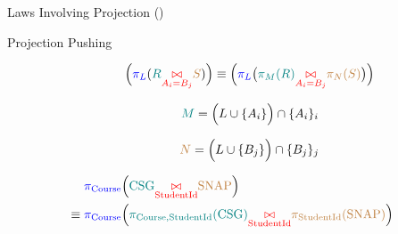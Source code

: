 
\begin{frame}{}
\end{frame}

\begin{frame}{}
\end{frame}


\begin{frame}
  \centerline{\Large Laws Involving Projection ()}

  \vspace{0.40cm}
  \begin{description}
    \item[Projection Pushing]
    \[
      \Big(\textcolor{blue}{\pi_{L}}(\textcolor{teal}{R} \textcolor{red}{\underset{A_i = B_j} \bowtie} \textcolor{brown}{S})\Big) \equiv 
	\Big(\textcolor{blue}{\pi_{L}}\big(\textcolor{teal}{\pi_{M}(R)} \textcolor{red}{\underset{A_i = B_j} \bowtie} \textcolor{brown}{\pi_{N}(S)}\big)\Big)
    \]

    \[
      \textcolor{teal}{M} = \Big(L \cup \{A_i\}\Big) \cap \{A_i\}_{i}
    \]

    \[
      \textcolor{brown}{N} = \Big(L \cup \{B_j\}\Big) \cap \{B_j\}_{j}
    \]
  \end{description}
\end{frame}

\begin{frame}{}

  \vspace{-0.50cm}
  \begin{align*}
    &\textcolor{blue}{\pi_{\text{Course}{}}} \Big(\textcolor{teal}{\text{CSG}{}} \textcolor{red}{\underset{\text{StudentId}{}}{\bowtie}} \textcolor{brown}{\text{SNAP}{}} \Big) \\
    \equiv\; &\textcolor{blue}{\pi_{\text{Course}{}}} \Big(\textcolor{teal}{\pi_{\text{Course},\text{StudentId}} (\text{CSG})} \textcolor{red}{\underset{\text{StudentId}{}}{\bowtie}} \textcolor{brown}{\pi_{\text{StudentId}{}}(\text{SNAP}{})}\Big)
  \end{align*}
\end{frame}

\begin{frame}{}
\end{frame}
